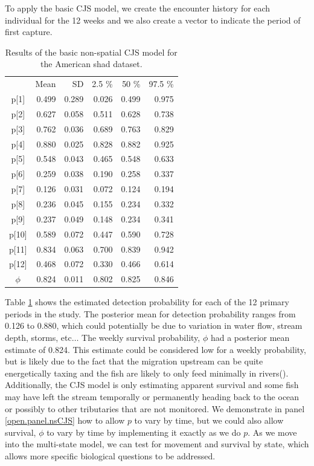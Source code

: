 To apply the basic CJS model, we create the
encounter history for each individual for the 12 weeks and we also create
a vector to indicate the period of first capture.

\begin{table}
\centering
\caption{Results of the basic non-spatial CJS model for the American shad dataset.
}
\begin{tabular}{crrrrr}
\hline \hline
&    Mean   &  SD  &  2.5 \%   &   50 \%    &  97.5 \% \\
p[1] & 0.499 & 0.289 & 0.026 & 0.499 & 0.975 \\
p[2] & 0.627 & 0.058 & 0.511 & 0.628 & 0.738 \\
p[3] & 0.762 & 0.036 & 0.689 & 0.763 & 0.829 \\
p[4] & 0.880 & 0.025 & 0.828 & 0.882 & 0.925 \\
p[5] & 0.548 & 0.043 & 0.465 & 0.548 & 0.633 \\
p[6] & 0.259 & 0.038 & 0.190 & 0.258 & 0.337 \\
p[7] & 0.126 & 0.031 & 0.072 & 0.124 & 0.194 \\
p[8] & 0.236 & 0.045 & 0.155 & 0.234 & 0.332 \\
p[9] & 0.237 & 0.049 & 0.148 & 0.234 & 0.341 \\
p[10]& 0.589 & 0.072 & 0.447 & 0.590 & 0.728  \\
p[11]& 0.834 & 0.063 & 0.700 & 0.839 & 0.942 \\
p[12]& 0.468 & 0.072 & 0.330 & 0.466 & 0.614 \\
$\phi$  & 0.824 & 0.011 & 0.802 & 0.825 & 0.846 \\
\hline
\end{tabular}
\label{open.tab.simple-shad}
\end{table}

Table \ref{open.tab.simple-shad} shows the estimated detection probability for each of the 12 primary periods
in the study.  The posterior mean for detection probability ranges from 0.126 to 0.880, which could potentially
be due to variation in water flow, stream depth, storms, etc$\dots$  The weekly survival probability, $\phi$ had a
posterior mean estimate of 0.824.  This estimate could be considered low for a weekly probability, but
is likely due to the fact
that the migration upstream can be quite energetically taxing and the fish are likely to only feed minimally
in rivers(\citep{leggett_carscadden:1978, leonard_mccormick:1999}).
Additionally, the CJS model is only estimating apparent survival
and some fish may have left the stream temporally or permanently heading back to the ocean
or possibly to other tributaries that are not monitored.
We demonstrate in panel \ref{open.panel.nsCJS}
how to allow $p$ to vary by time, but we could also allow survival, $\phi$ to vary by time by
implementing it exactly as
we do $p$.
As we move into the multi-state model, %
we can test for movement and survival by state, which allows more specific biological questions to be addressed.



